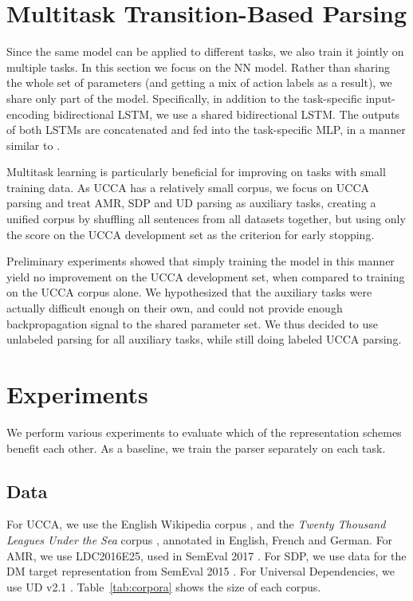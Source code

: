 \documentclass[11pt,a4paper]{article}
\begin{document}
\section{Multitask Transition-Based Parsing}\label{sec:multitask}

Since the same model can be applied to different tasks, we also train it jointly on multiple tasks.
In this section we focus on the NN model.
Rather than sharing the whole set of parameters (and getting a mix of action labels as a result),
we share only part of the model.
Specifically, in addition to the task-specific input-encoding bidirectional LSTM,
we use a shared bidirectional LSTM. The outputs of both LSTMs are concatenated and
fed into the task-specific MLP, in a manner similar to \citet{P17-1186}.

Multitask learning is particularly beneficial for improving on tasks with small training data.
As UCCA has a relatively small corpus, we focus on UCCA parsing and treat AMR, SDP and UD parsing
as auxiliary tasks, creating a unified corpus by shuffling all sentences from all datasets together,
but using only the score on the UCCA development set as the criterion for early stopping.

Preliminary experiments showed that simply training the model in this manner yield no improvement
on the UCCA development set, when compared to training on the UCCA corpus alone.
We hypothesized that the auxiliary tasks were actually difficult enough on their own,
and could not provide enough backpropagation signal to the shared parameter set.
We thus decided to use unlabeled parsing for all auxiliary tasks, while still doing labeled UCCA parsing.


\section{Experiments}\label{sec:experiments}

We perform various experiments to evaluate which of the representation schemes benefit each other.
As a baseline, we train the parser separately on each task.

\subsection{Data}\label{sec:data}

For UCCA, we use the English Wikipedia corpus \cite{abend2013universal},
and the \textit{Twenty Thousand Leagues Under the Sea} corpus \cite[20K leagues;][]{sulem2015conceptual},
annotated in English, French and German.
For AMR, we use LDC2016E25, used in SemEval 2017 \cite{may2017semeval}.
For SDP, we use data for the DM target representation from SemEval 2015 \cite{oepen2015semeval}.
For Universal Dependencies, we use UD v2.1 \cite{11234/1-2515}.
Table~\ref{tab:corpora} shows the size of each corpus.
\end{document}
